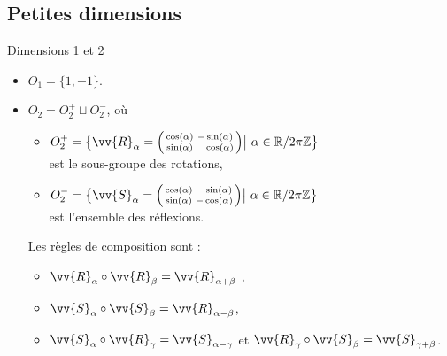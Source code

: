 \documentclass[bigger]{m53beamer}
\begin{document}
\subsection{Petites dimensions}
\begin{frame}{Dimensions 1 et 2}
  \begin{itemize}[<+(1)->]
    \item $O_{1} = \{1,-1\}$.
    \item $O_{2} = O_{2}^{+} \sqcup O_{2}^{-}$, où
      \begin{itemize}[<+(1)->]
        \item $O_{2}^{+}=\big\{ \vv{R}_{\alpha}=\begin{psmallmatrix}\cos(\alpha)&-\sin(\alpha)\\\sin(\alpha)&\phantom{-}\cos(\alpha)\end{psmallmatrix} \big|\ \alpha \in \mathbb{R}/2\pi\mathbb{Z} \big\}$\\ est le sous-groupe des rotations,
        \item $O_{2}^{-}=\big\{ \vv{S}_{\alpha}=\begin{psmallmatrix}\cos(\alpha)&\phantom{-}\sin(\alpha)\\\sin(\alpha)&-\cos(\alpha)\end{psmallmatrix} \big|\ \alpha \in \mathbb{R}/2\pi\mathbb{Z} \big\}$\\ est l'ensemble des réflexions.\pause\\
      \end{itemize}\pause
      Les règles de composition sont :
      \begin{itemize}[<+(1)->]
        \item $\vv{R}_{\alpha}\circ \vv{R}_{\beta} = \vv{R}_{\alpha+\beta}$ \pause{},
        \item $\vv{S}_{\alpha}\circ \vv{S}_{\beta} = \vv{R}_{\alpha-\beta}$,
        \item $\vv{S}_{\alpha}\circ \vv{R}_{\gamma} = \vv{S}_{\alpha-\gamma}$ et $\vv{R}_{\gamma}\circ \vv{S}_{\beta} = \vv{S}_{\gamma+\beta}$.
      \end{itemize}\pause
  \end{itemize}
\end{frame}
\end{document}
